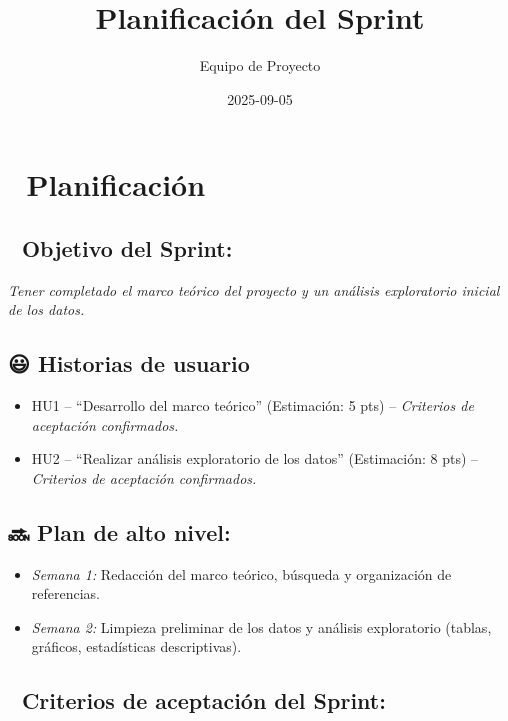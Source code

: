 \documentclass[
  11pt,
]{article}
\title{Planificación del Sprint}
\author{Equipo de Proyecto}
\date{2025-09-05}
\providecommand{\tightlist}{%
  \setlength{\itemsep}{0pt}\setlength{\parskip}{0pt}}
\renewcommand*\contentsname{Table of contents}
\newcommand\contentsname{Table of contents}
\begin{document}
\maketitle

\renewcommand*\contentsname{Table of contents}
{
\hypersetup{linkcolor=}
\setcounter{tocdepth}{3}
\tableofcontents
}

\section{📆 Planificación}\label{planificaciuxf3n}

\subsection{🎯 Objetivo del Sprint:}\label{objetivo-del-sprint}

\emph{Tener completado el marco teórico del proyecto y un análisis
exploratorio inicial de los datos.}

\subsection{😃 Historias de usuario}\label{historias-de-usuario}

\begin{itemize}
\tightlist
\item
  HU1 -- ``Desarrollo del marco teórico'' (Estimación: 5 pts) --
  \emph{Criterios de aceptación confirmados.}
\item
  HU2 -- ``Realizar análisis exploratorio de los datos'' (Estimación: 8
  pts) -- \emph{Criterios de aceptación confirmados.}
\end{itemize}

\subsection{🔜 Plan de alto nivel:}\label{plan-de-alto-nivel}

\begin{itemize}
\tightlist
\item
  \emph{Semana 1:} Redacción del marco teórico, búsqueda y organización
  de referencias.
\item
  \emph{Semana 2:} Limpieza preliminar de los datos y análisis
  exploratorio (tablas, gráficos, estadísticas descriptivas).
\end{itemize}

\subsection{🥇 Criterios de aceptación del
Sprint:}\label{criterios-de-aceptaciuxf3n-del-sprint}
\end{document}
